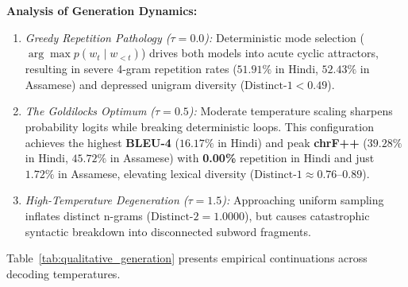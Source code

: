 \documentclass[11pt,a4paper]{article}
\begin{document}
\noindent\textbf{Analysis of Generation Dynamics:}
\begin{enumerate}[noitemsep]
    \item \textit{Greedy Repetition Pathology ($\tau=0.0$):} Deterministic mode selection ($\arg\max p(w_t \mid w_{<t})$) drives both models into acute cyclic attractors, resulting in severe 4-gram repetition rates ($51.91\%$ in Hindi, $52.43\%$ in Assamese) and depressed unigram diversity ($\text{Distinct-1} < 0.49$).
    \item \textit{The Goldilocks Optimum ($\tau=0.5$):} Moderate temperature scaling sharpens probability logits while breaking deterministic loops. This configuration achieves the highest \textbf{BLEU-4} ($16.17\%$ in Hindi) and peak \textbf{chrF++} ($39.28\%$ in Hindi, $45.72\%$ in Assamese) with \textbf{0.00\%} repetition in Hindi and just $1.72\%$ in Assamese, elevating lexical diversity ($\text{Distinct-1} \approx 0.76\text{--}0.89$).
    \item \textit{High-Temperature Degeneration ($\tau=1.5$):} Approaching uniform sampling inflates distinct n-grams ($\text{Distinct-2} = 1.0000$), but causes catastrophic syntactic breakdown into disconnected subword fragments.
\end{enumerate}

Table~\ref{tab:qualitative_generation} presents empirical continuations across decoding temperatures.
\end{document}

